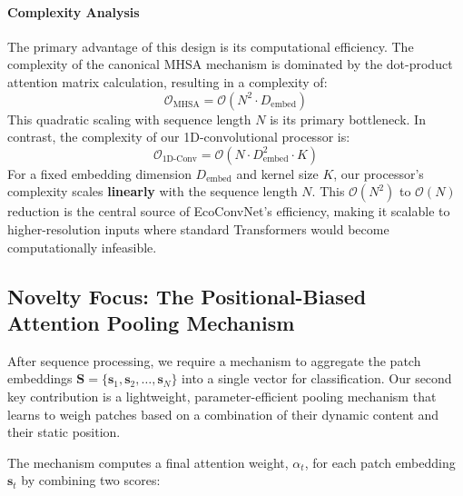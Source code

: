 \documentclass[12pt, a4paper]{article}
\begin{document}
\paragraph{Complexity Analysis}
The primary advantage of this design is its computational efficiency. The complexity of the canonical MHSA mechanism is dominated by the dot-product attention matrix calculation, resulting in a complexity of:
\begin{equation}
\mathcal{O}_{\text{MHSA}} = \mathcal{O}(N^2 \cdot D_{\text{embed}})
\end{equation}
This quadratic scaling with sequence length $N$ is its primary bottleneck. In contrast, the complexity of our 1D-convolutional processor is:
\begin{equation}
\mathcal{O}_{\text{1D-Conv}} = \mathcal{O}(N \cdot D_{\text{embed}}^2 \cdot K)
\end{equation}
For a fixed embedding dimension $D_{\text{embed}}$ and kernel size $K$, our processor's complexity scales \textbf{linearly} with the sequence length $N$. This $\mathcal{O}(N^2)$ to $\mathcal{O}(N)$ reduction is the central source of EcoConvNet's efficiency, making it scalable to higher-resolution inputs where standard Transformers would become computationally infeasible.

\subsection{Novelty Focus: The Positional-Biased Attention Pooling Mechanism}
\label{ssec:pooling_mechanism}

After sequence processing, we require a mechanism to aggregate the patch embeddings $\mathbf{S} = \{\mathbf{s}_1, \mathbf{s}_2, \dots, \mathbf{s}_N\}$ into a single vector for classification. Our second key contribution is a lightweight, parameter-efficient pooling mechanism that learns to weigh patches based on a combination of their dynamic content and their static position.

The mechanism computes a final attention weight, $\alpha_t$, for each patch embedding $\mathbf{s}_t$ by combining two scores:
\end{document}
